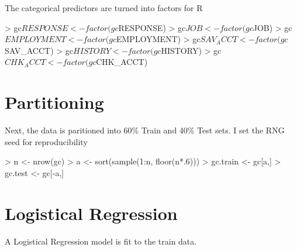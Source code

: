 \documentclass{article}
\begin{document}
\noindent
The categorical predictors are turned into factors for R
\begin{Schunk}
\begin{Sinput}
> gc$RESPONSE <- factor(gc$RESPONSE)
> gc$JOB <- factor(gc$JOB)
> gc$EMPLOYMENT <- factor(gc$EMPLOYMENT)
> gc$SAV_ACCT <- factor(gc$SAV_ACCT)
> gc$HISTORY <- factor(gc$HISTORY)
> gc$CHK_ACCT <- factor(gc$CHK_ACCT)
\end{Sinput}
\end{Schunk}

\section*{Partitioning}
Next, the data is paritioned into 60\% Train and 40\% Test sets. I set the RNG seed for reproducibility
\begin{Schunk}
\begin{Sinput}
> n <- nrow(gc)
> a <- sort(sample(1:n, floor(n*.6)))
> gc.train <- gc[a,]
> gc.test <- gc[-a,]
\end{Sinput}
\end{Schunk}

\section*{Logistical Regression}
A Logistical Regression model is fit to the train data. 
\end{document}
